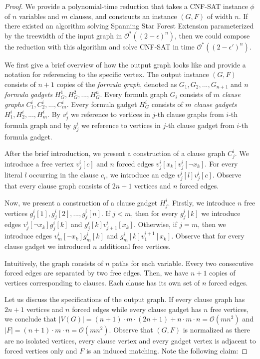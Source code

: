 \documentclass[en]{pracamgr}
\theoremstyle{definition}
\newcommand{\ssfep}{{\sc Spanning Star Forest Extension}}
\newcommand{\cnfsat}{{\sc CNF-SAT}}
\begin{document}
\begin{proof}
	We provide a polynomial-time reduction that takes a \cnfsat{} instance $\phi$ of $n$ variables and $m$ clauses, and constructs an instance $(G,F)$ of width $n$. If there existed an algorithm solving \ssfep{} parameterized by the treewidth of the input graph in $\mathcal{O}^*((2-\epsilon)^n)$, then we could compose the reduction with this algorithm and solve \cnfsat{} in time  $\mathcal{O}^*((2-\epsilon')^n)$.
	
	We first give a brief overview of how the output graph looks like and provide a notation for referencing to the specific vertex. The output instance $(G,F)$ consists of $n+1$ copies of the \textit{formula graph}, denoted as $G_1,G_2,...,G_{n+1}$ and $n$ \textit{formula gadgets} $H^1_G,H^2_G,...,H^n_G$. Every formula graph $G_i$ consists of $m$ \textit{clause graphs} $C^i_1,C^i_2,...,C^i_m$. Every formula gadget $H^i_G$ consists of $m$ \textit{clause gadgets} $H^i_1,H^i_2,...,H^i_m$. By $v^i_j$ we reference to vertices in $j$-th clause graphs from $i$-th formula graph and by $g^i_j$ we reference to vertices in $j$-th clause gadget from $i$-th formula gadget.
	
	After the brief introduction, we present a construction of a clause graph $C^i_j$. We introduce a free vertex $v^i_j[c]$ and $n$ forced edges $v^i_j[x_k]v^i_j[\neg x_k]$. For every literal $l$ occurring in the clause $c_i$, we introduce an edge $v^i_j[l]v^i_j[c]$. Observe that every clause graph consists of $2n+1$ vertices and $n$ forced edges.
	
	Now, we present a construction of a clause gadget $H^i_j$. Firstly, we introduce $n$ free vertices $g^i_j[1],g^i_j[2],...,g^i_j[n]$. If $j < m$, then for every $g^i_j[k]$ we introduce edges $v^i_j[\neg x_k]g^i_j[k]$ and $g^i_j[k]v^i_{j+1}[x_k]$. Otherwise, if $j=m$, then we introduce edges $v^i_m[\neg x_k]g^i_m[k]$ and $g^i_m[k]v^{i+1}_1[x_k]$. Observe that for every clause gadget we introduced $n$ additional free vertices.
	
	Intuitively, the graph consists of $n$ paths for each variable. Every two consecutive forced edges are separated by two free edges. Then, we have $n+1$ copies of vertices corresponding to clauses. Each clause has its own set of $n$ forced edges. 
	
	Let us discuss the specifications of the output graph. If every clause graph has $2n+1$ vertices and $n$ forced edges while every clause gadget has $n$ free vertices, we conclude that $|V(G)| = (n+1) \cdot m \cdot (2n+1) + n \cdot m \cdot n= \mathcal{O}(mn^2)$ and $|F|=(n+1) \cdot m \cdot n= \mathcal{O}(mn^2)$. Observe that $(G,F)$ is normalized as there are no isolated vertices, every clause vertex and every gadget vertex is adjacent to forced vertices only and $F$ is an induced matching. Note the following claim:
	

\end{proof}
\end{document}
